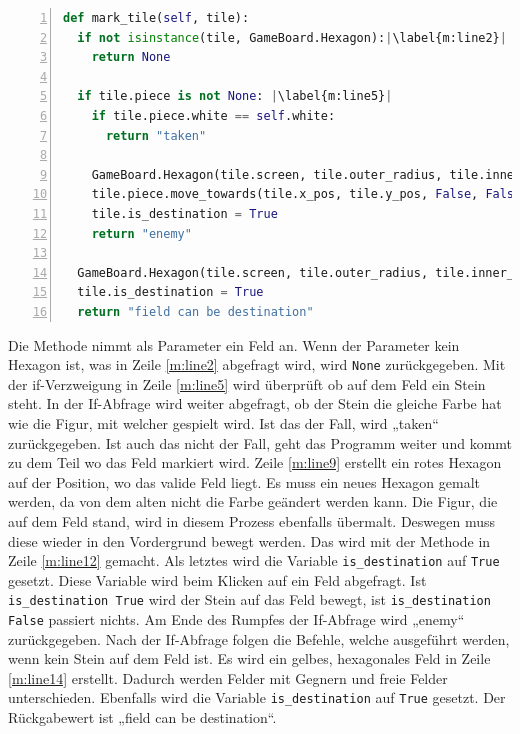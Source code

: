 \begin{lstlisting}[language=python,caption={Felder markieren},captionpos=b,label={lst:hexa:markieren},numbers=left,frame=none,escapechar=|]
def mark_tile(self, tile):
  if not isinstance(tile, GameBoard.Hexagon):|\label{m:line2}|
    return None

  if tile.piece is not None: |\label{m:line5}|
    if tile.piece.white == self.white:
      return "taken"

    GameBoard.Hexagon(tile.screen, tile.outer_radius, tile.inner_radius,tile.x_pos, tile.y_pos, (255, 0, 0)) |\label{m:line9}|
    tile.piece.move_towards(tile.x_pos, tile.y_pos, False, False) |\label{m:line12}|
    tile.is_destination = True
    return "enemy"
  
  GameBoard.Hexagon(tile.screen, tile.outer_radius, tile.inner_radius, tile.x_pos, tile.y_pos, (249, 215, 28))|\label{m:line14}|
  tile.is_destination = True
  return "field can be destination"
\end{lstlisting}

Die Methode nimmt als Parameter ein Feld an. Wenn der Parameter kein Hexagon ist, was in Zeile \ref{m:line2} abgefragt wird, wird \texttt{None} zurückgegeben. Mit der if-Verzweigung in Zeile \ref{m:line5} wird überprüft ob auf dem Feld ein Stein steht. In der If-Abfrage wird weiter abgefragt, ob der Stein die gleiche Farbe hat wie die Figur, mit welcher gespielt wird. Ist das der Fall, wird „taken“ zurückgegeben. Ist auch das nicht der Fall, geht das Programm weiter und kommt zu dem Teil wo das Feld markiert wird. Zeile \ref{m:line9} erstellt ein rotes Hexagon auf der Position, wo das valide Feld liegt. Es muss ein neues Hexagon gemalt werden, da von dem alten nicht die Farbe geändert werden kann. Die Figur, die auf dem Feld stand, wird in diesem Prozess ebenfalls übermalt. Deswegen muss diese wieder in den Vordergrund bewegt werden. Das wird mit der Methode in Zeile \ref{m:line12} gemacht. Als letztes wird die Variable \texttt{is\_destination} auf \texttt{True} gesetzt. Diese Variable wird beim Klicken auf ein Feld abgefragt. Ist \texttt{is\_destination True} wird der Stein auf das Feld bewegt, ist \texttt{is\_destination False} passiert nichts. Am Ende des Rumpfes der If-Abfrage wird „enemy“ zurückgegeben. Nach der If-Abfrage folgen die Befehle, welche ausgeführt werden, wenn kein Stein auf dem Feld ist. Es wird ein gelbes, hexagonales Feld in Zeile \ref{m:line14} erstellt. Dadurch werden Felder mit Gegnern und freie Felder unterschieden. Ebenfalls wird die Variable \texttt{is\_destination} auf \texttt{True} gesetzt. Der Rückgabewert ist „field can be destination“.

